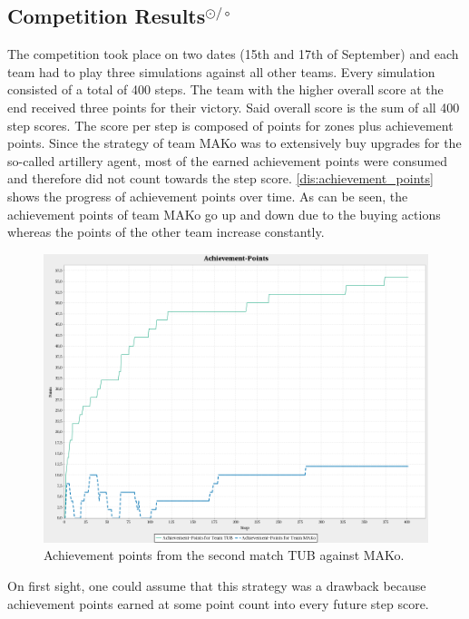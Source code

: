 \subsection[Competition Results]{Competition Results$^{\odot/\circ}$}
The competition took place on two dates (15th and 17th of September) and each team had to play three simulations against all other teams.
Every simulation consisted of a total of 400 steps.
The team with the higher overall score at the end received three points for their victory.
Said overall score is the sum of all 400 step scores.
The score per step is composed of points for zones plus achievement points.
Since the strategy of team MAKo was to extensively buy upgrades for the so-called artillery agent, most of the earned achievement points were consumed and therefore did not count towards the step score.
\autoref{dis:achievement_points} shows the progress of achievement points over time.
As can be seen, the achievement points of team MAKo go up and down due to the buying actions whereas the points of the other team increase constantly.
\begin{figure}[ht]
	\centering
	\includegraphics[width=\textwidth]{images/AchievementPoints.png}
  \caption{Achievement points from the second match TUB against MAKo.}
	\label{dis:achievement_points}
\end{figure}
On first sight, one could assume that this strategy was a drawback because achievement points earned at some point count into every future step score.
